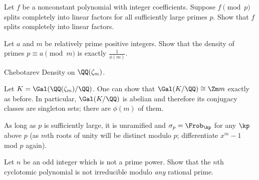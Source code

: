 \begin{problem}
	Let $f$ be a nonconstant polynomial with integer coefficients.
	Suppose $f \pmod p$ splits completely into linear factors
	for all sufficiently large primes $p$.
	Show that $f$ splits completely into linear factors.
\end{problem}

\begin{dproblem}
	Let $a$ and $m$ be relatively prime positive integers.
	Show that the density of primes $p \equiv a \pmod m$ is exactly $\frac{1}{\phi(m)}$.
	\begin{hint}
		Chebotarev Density on $\QQ(\zeta_m)$.
	\end{hint}
	\begin{sol}
		Let $K = \Gal(\QQ(\zeta_m)/\QQ)$.
		One can show that $\Gal(K/\QQ) \cong \Zm m$ exactly as before.
		In particular, $\Gal(K/\QQ)$ is abelian and therefore its conjugacy classes
		are singleton sets; there are $\phi(m)$ of them.

		As long as $p$ is sufficiently large, it is unramified
		and $\sigma_p = \Frob_\kp$ for any $\kp$ above $p$
		(as $m$th roots of unity will be distinct modulo $p$;
		differentiate $x^m-1$ mod $p$ again).
	\end{sol}
\end{dproblem}

\begin{problem}
	Let $n$ be an odd integer which is not a prime power.
	Show that the $n$th cyclotomic polynomial is not
	irreducible modulo \emph{any} rational prime.
\end{problem}

